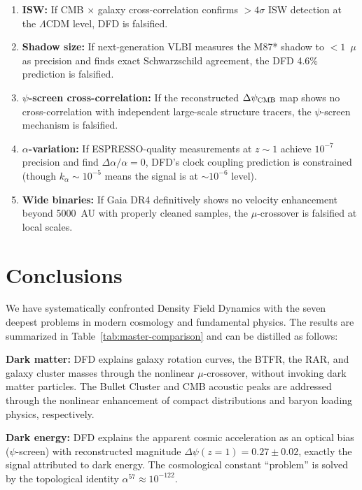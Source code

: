 \documentclass[aps,prd,twocolumn,superscriptaddress,nofootinbib]{revtex4-2}
\begin{document}
\begin{enumerate}
\item \textbf{ISW:} If CMB $\times$ galaxy cross-correlation confirms
  $>4\sigma$ ISW detection at the $\Lambda$CDM level, DFD is falsified.

\item \textbf{Shadow size:} If next-generation VLBI measures the M87*
  shadow to $<1$~$\mu$as precision and finds exact Schwarzschild
  agreement, the DFD 4.6\% prediction is falsified.

\item \textbf{$\psi$-screen cross-correlation:} If the reconstructed
  $\Delta\psi_{\rm CMB}$ map shows no cross-correlation with
  independent large-scale structure tracers, the $\psi$-screen
  mechanism is falsified.

\item \textbf{$\alpha$-variation:} If ESPRESSO-quality measurements
  at $z \sim 1$ achieve $10^{-7}$ precision and find
  $\Delta\alpha/\alpha = 0$, DFD's clock coupling prediction is
  constrained (though $k_\alpha \sim 10^{-5}$ means the signal
  is at $\sim 10^{-6}$ level).

\item \textbf{Wide binaries:} If Gaia DR4 definitively shows no
  velocity enhancement beyond 5000~AU with properly cleaned samples,
  the $\mu$-crossover is falsified at local scales.
\end{enumerate}

\section{Conclusions}\label{sec:conclusions}

We have systematically confronted Density Field Dynamics with the
seven deepest problems in modern cosmology and fundamental physics.
The results are summarized in Table~\ref{tab:master-comparison}
and can be distilled as follows:

\textbf{Dark matter:} DFD explains galaxy rotation curves, the BTFR,
the RAR, and galaxy cluster masses through the nonlinear
$\mu$-crossover, without invoking dark matter particles. The Bullet
Cluster and CMB acoustic peaks are addressed through the nonlinear
enhancement of compact distributions and baryon loading physics,
respectively.

\textbf{Dark energy:} DFD explains the apparent cosmic acceleration
as an optical bias ($\psi$-screen) with reconstructed magnitude
$\Delta\psi(z=1) = 0.27 \pm 0.02$, exactly the signal attributed
to dark energy. The cosmological constant ``problem'' is solved by
the topological identity $\alpha^{57} \approx 10^{-122}$.
\end{document}

